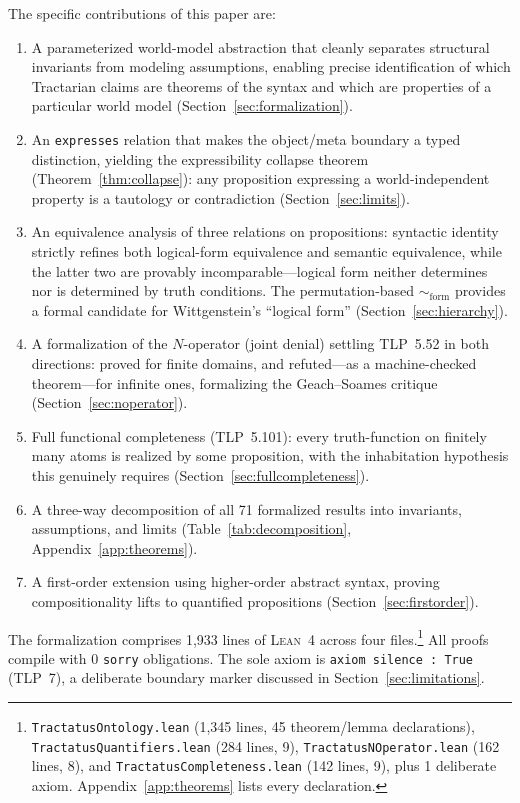 \documentclass[10pt, letterpaper]{article}
\theoremstyle{definition}
\theoremstyle{remark}
\newcommand{\formEq}{\sim_{\mathrm{form}}}
\newcommand{\Lean}{\textsc{Lean}}
\begin{document}
\noindent
The specific contributions of this paper are:
\begin{enumerate}[nosep, label=(\arabic*)]
  \item A parameterized world-model abstraction that cleanly
    separates structural invariants from modeling assumptions,
    enabling precise identification of which Tractarian claims
    are theorems of the syntax and which are properties of a
    particular world model (Section~\ref{sec:formalization}).
  \item An \texttt{expresses} relation that makes the object/meta
    boundary a typed distinction, yielding the expressibility
    collapse theorem (Theorem~\ref{thm:collapse}): any proposition
    expressing a world-independent property is a tautology or
    contradiction (Section~\ref{sec:limits}).
  \item An equivalence analysis of three relations on
    propositions: syntactic identity strictly refines both
    logical-form equivalence and semantic equivalence, while the
    latter two are provably incomparable---logical form neither
    determines nor is determined by truth conditions.  The
    permutation-based $\formEq$ provides a formal candidate for
    Wittgenstein's ``logical form'' (Section~\ref{sec:hierarchy}).
  \item A formalization of the $N$-operator (joint denial)
    settling TLP~5.52 in both directions: proved for finite
    domains, and refuted---as a machine-checked theorem---for
    infinite ones, formalizing the Geach--Soames critique
    (Section~\ref{sec:noperator}).
  \item Full functional completeness (TLP~5.101): every
    truth-function on finitely many atoms is realized by some
    proposition, with the inhabitation hypothesis this genuinely
    requires (Section~\ref{sec:fullcompleteness}).
  \item A three-way decomposition of all 71 formalized results
    into invariants, assumptions, and limits
    (Table~\ref{tab:decomposition}, Appendix~\ref{app:theorems}).
  \item A first-order extension using higher-order abstract syntax,
    proving compositionality lifts to quantified propositions
    (Section~\ref{sec:firstorder}).
\end{enumerate}

\noindent
The formalization comprises 1,933 lines of \Lean~4 across four
files.\footnote{%
  \texttt{TractatusOntology.lean} (1,345 lines, 45 theorem/lemma
  declarations), \texttt{TractatusQuantifiers.lean} (284 lines, 9),
  \texttt{TractatusNOperator.lean} (162 lines, 8), and
  \texttt{TractatusCompleteness.lean} (142 lines, 9), plus 1
  deliberate axiom.  Appendix~\ref{app:theorems} lists every
  declaration.}
All proofs compile with 0 \texttt{sorry} obligations.
The sole axiom is \texttt{axiom silence : True} (TLP~7), a
deliberate boundary marker discussed in
Section~\ref{sec:limitations}.
\end{document}
